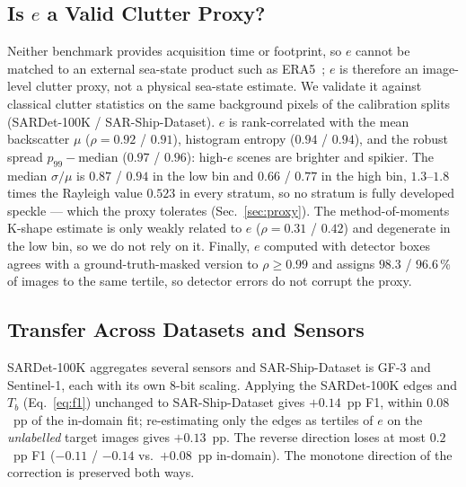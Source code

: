 \documentclass[journal]{IEEEtran}
\providecommand{\linelabel}[1]{}
\begin{document}
\subsection{Is $e$ a Valid Clutter Proxy?}
\label{sec:proxyval}
\linelabel{ln:proxy}Neither benchmark provides acquisition time or footprint, so $e$
cannot be matched to an external sea-state product such as
ERA5~\cite{hersbach2020}; $e$ is therefore an image-level clutter
proxy, not a physical sea-state estimate. We validate it against
classical clutter statistics on the same background pixels of the
calibration splits (SARDet-100K / SAR-Ship-Dataset). $e$ is rank-correlated with the
mean backscatter $\mu$ ($\rho{=}0.92$ / $0.91$), histogram entropy
($0.94$ / $0.94$), and the robust spread $p_{99}-\text{median}$
($0.97$ / $0.96$): high-$e$ scenes are brighter and spikier. The median
$\sigma/\mu$ is $0.87$ / $0.94$ in the low bin and $0.66$ / $0.77$ in the
high bin, $1.3$--$1.8$ times the Rayleigh value $0.523$ in every stratum,
so no stratum is fully developed speckle --- which the proxy tolerates
(Sec.~\ref{sec:proxy}). The method-of-moments K-shape estimate is only
weakly related to $e$ ($\rho{=}0.31$ / $0.42$) and degenerate in the low
bin, so we do not rely on it. Finally, $e$ computed with detector boxes
agrees with a ground-truth-masked version to $\rho\ge0.99$ and assigns
$98.3$ / $96.6$\,\% of images to the same tertile, so detector errors do
not corrupt the proxy.\linelabel{ln:proxyend}

\subsection{Transfer Across Datasets and Sensors}
\label{sec:transfer}
\linelabel{ln:transfer}SARDet-100K aggregates several sensors and SAR-Ship-Dataset is GF-3 and
Sentinel-1, each with its own 8-bit scaling. Applying the SARDet-100K
edges and $T_b$ (Eq.~\eqref{eq:f1}) unchanged to SAR-Ship-Dataset gives
$+0.14$~pp F1, within $0.08$~pp of the in-domain fit; re-estimating only
the edges as tertiles of $e$ on the \emph{unlabelled} target images gives
$+0.13$~pp. The reverse direction loses at most $0.2$~pp F1 ($-0.11$ /
$-0.14$ vs.\ $+0.08$~pp in-domain). The monotone direction of the
correction is preserved both ways.\linelabel{ln:transferend}
\end{document}

